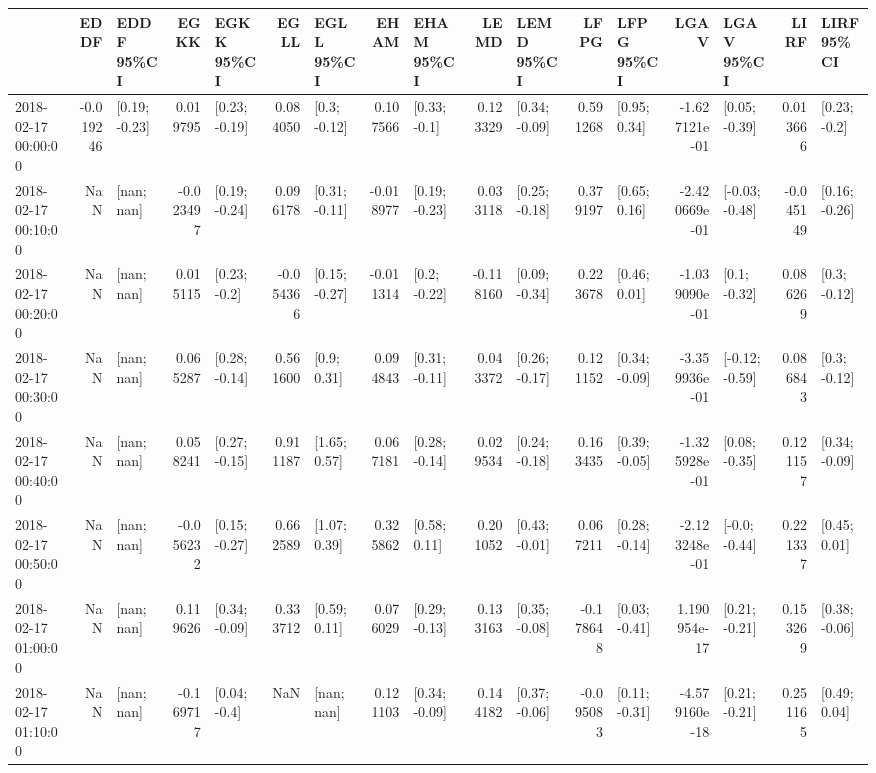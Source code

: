 \begin{tabular}{lrlrlrlrlrlrlrlrl}
\toprule
{} &      EDDF &      EDDF 95\%CI &      EGKK &      EGKK 95\%CI &      EGLL &      EGLL 95\%CI &      EHAM &      EHAM 95\%CI &      LEMD &      LEMD 95\%CI &      LFPG &      LFPG 95\%CI &          LGAV &      LGAV 95\%CI &      LIRF &      LIRF 95\%CI \\
\midrule
2018-02-17 00:00:00 & -0.019246 &   [0.19; -0.23] &  0.019795 &   [0.23; -0.19] &  0.084050 &    [0.3; -0.12] &  0.107566 &    [0.33; -0.1] &  0.123329 &   [0.34; -0.09] &  0.591268 &    [0.95; 0.34] & -1.627121e-01 &   [0.05; -0.39] &  0.013666 &    [0.23; -0.2] \\
2018-02-17 00:10:00 &       NaN &      [nan; nan] & -0.023497 &   [0.19; -0.24] &  0.096178 &   [0.31; -0.11] & -0.018977 &   [0.19; -0.23] &  0.033118 &   [0.25; -0.18] &  0.379197 &    [0.65; 0.16] & -2.420669e-01 &  [-0.03; -0.48] & -0.045149 &   [0.16; -0.26] \\
2018-02-17 00:20:00 &       NaN &      [nan; nan] &  0.015115 &    [0.23; -0.2] & -0.054366 &   [0.15; -0.27] & -0.011314 &    [0.2; -0.22] & -0.118160 &   [0.09; -0.34] &  0.223678 &    [0.46; 0.01] & -1.039090e-01 &    [0.1; -0.32] &  0.086269 &    [0.3; -0.12] \\
2018-02-17 00:30:00 &       NaN &      [nan; nan] &  0.065287 &   [0.28; -0.14] &  0.561600 &     [0.9; 0.31] &  0.094843 &   [0.31; -0.11] &  0.043372 &   [0.26; -0.17] &  0.121152 &   [0.34; -0.09] & -3.359936e-01 &  [-0.12; -0.59] &  0.086843 &    [0.3; -0.12] \\
2018-02-17 00:40:00 &       NaN &      [nan; nan] &  0.058241 &   [0.27; -0.15] &  0.911187 &    [1.65; 0.57] &  0.067181 &   [0.28; -0.14] &  0.029534 &   [0.24; -0.18] &  0.163435 &   [0.39; -0.05] & -1.325928e-01 &   [0.08; -0.35] &  0.121157 &   [0.34; -0.09] \\
2018-02-17 00:50:00 &       NaN &      [nan; nan] & -0.056232 &   [0.15; -0.27] &  0.662589 &    [1.07; 0.39] &  0.325862 &    [0.58; 0.11] &  0.201052 &   [0.43; -0.01] &  0.067211 &   [0.28; -0.14] & -2.123248e-01 &   [-0.0; -0.44] &  0.221337 &    [0.45; 0.01] \\
2018-02-17 01:00:00 &       NaN &      [nan; nan] &  0.119626 &   [0.34; -0.09] &  0.333712 &    [0.59; 0.11] &  0.076029 &   [0.29; -0.13] &  0.133163 &   [0.35; -0.08] & -0.178648 &   [0.03; -0.41] &  1.190954e-17 &   [0.21; -0.21] &  0.153269 &   [0.38; -0.06] \\
2018-02-17 01:10:00 &       NaN &      [nan; nan] & -0.169717 &    [0.04; -0.4] &       NaN &      [nan; nan] &  0.121103 &   [0.34; -0.09] &  0.144182 &   [0.37; -0.06] & -0.095083 &   [0.11; -0.31] & -4.579160e-18 &   [0.21; -0.21] &  0.251165 &    [0.49; 0.04] \\

\end{tabular}
